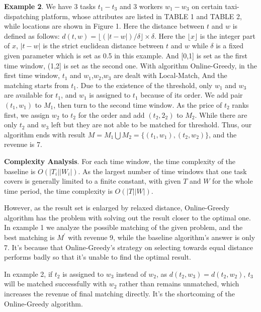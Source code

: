 \documentclass[color,twoside,amssymb,twocolumn]{article}
\begin{document}

\textbf{Example 2}. We have 3 tasks $t_1 - t_3$ and 3 workers $w_1-w_3$ on certain taxi-dispatching platform, whose attributes are listed in TABLE 1 and TABLE 2, while locations are shown in Figure 1. Here the distance between $t$ and $w$ is defined as follows: $d(t,w)=\lfloor (|t-w|)/\delta \rfloor \times \delta$. Here the $\lfloor x \rfloor$ is the integer part of $x$, $|t-w|$ is the strict euclidean distance between $t$ and $w$ while $\delta$ is a fixed given parameter which is set as 0.5 in this example. And [0,1] is set as the first time window, (1,2] is set as the second one. With algorithm Online-Greedy, in the first time window, {$t_1$} and {$w_1$,$w_2$,$w_3$} are dealt with Local-Match, And the matching starts from $t_1$. Due to the existence of the threshold, only $w_1$ and $w_3$ are available for $t_1$, and $w_1$ is assigned to $t_1$ because of its order. We add pair $(t_1,w_1)$ to $M_1$, then turn to the second time window. As the price of $t_2$ ranks first, we assign $w_2$ to $t_2$ for the order and add $(t_2,2_2)$ to $M_2$. While there are only $t_2$ and $w_3$ left but they are not able to be matched for threshold. Thus, our algorithm ends with result $M = M_1 \bigcup M_2 = \{(t_1,w_1),(t_2,w_2)\}$, and the revenue is 7.

\textbf{Complexity Analysis}. For each time window, the time complexity of the baseline is $O(|T_i||W_i|)$. As the largest number of time windows that one task covers is generally limited to a finite constant, with given $T$ and $W$ for the whole time period, the time complexity is  $O(|T||W|)$.

However, as the result set is enlarged by relaxed distance, Online-Greedy algorithm has the problem with solving out the result closer to the optimal one. In example 1 we analyze the possible matching of the given problem, and the best matching is $M^{'}$ with revenue 9, while the baseline algorithm's answer is only 7. It's because that Online-Greedy's strategy on selecting towards equal distance performs badly so that it's unable to find the optimal result. 

In example 2, if $t_2$ is assigned to $w_3$ instead of $w_2$, as $d(t_2,w_3)=d(t_2,w_2)$, $t_3$ will be matched successfully with $w_2$ rather than remains unmatched, which increases the revenue of final matching directly. It's the shortcoming of the Online-Greedy algorithm.
\end{document}
